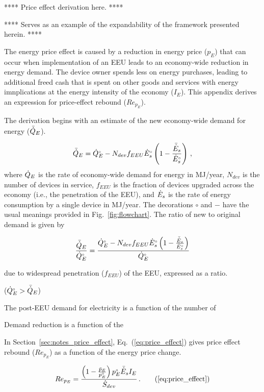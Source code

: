 

**** Price effect derivation here. ****

**** Serves as an example of the expandability 
of the framework presented herein. ****


The energy price effect is caused by a reduction 
in energy price ($p_E$)
that can occur when implementation of an EEU
leads to an economy-wide reduction in energy demand.
The device owner spends less on energy purchases, 
leading to additional freed cash
that is spent on other goods and services
with energy imnplications 
at the energy intensity of the economy ($I_E$).
This appendix derives an expression for 
price-effect rebound ($Re_{p_E}$).

The derivation begins with an estimate of the new economy-wide 
demand for energy ($\bar{\dot{Q}}_E$).

\begin{equation}
  \bar{\dot{Q}}_E = {}{\dot{Q}}^{\scriptscriptstyle \circ}_E - N_{dev} f_{EEU} {}{\dot{E}}^{\scriptscriptstyle \circ}_s \left( 1 - \frac{\bar{\dot{E}}_s}{{}{\dot{E}}^{\scriptscriptstyle \circ}_s} \right) \, ,
\end{equation}
%
where
$\dot{Q}_E$ is the rate of economy-wide demand for energy in MJ/year,
$N_{dev}$ is the number of devices in service, 
$f_{EEU}$ is the fraction of devices upgraded across the economy
(i.e., the penetration of the EEU), and
$\dot{E}_s$ is the rate of energy consumption by a single device in MJ/year.
The decorations $\circ$ and $-$ have the usual meanings
provided in Fig.~\ref{fig:flowchart}.
The ratio of new to original demand is given by

\begin{equation}
  \frac{\bar{\dot{Q}}_E}{{}{\dot{Q}}^{\scriptscriptstyle \circ}_E} =
        \frac{{}{\dot{Q}}^{\scriptscriptstyle \circ}_E - N_{dev} f_{EEU} {}{\dot{E}}^{\scriptscriptstyle \circ}_s \left( 1 - \frac{\bar{\dot{E}}_s}{{}{\dot{E}}^{\scriptscriptstyle \circ}_s}  \right)}
        {{}{\dot{Q}}^{\scriptscriptstyle \circ}_E}
\end{equation}
%



due to widespread penetration ($f_{EEU}$) of the EEU,
expressed as a ratio.


 (${}{\dot{Q}}^{\scriptscriptstyle \circ}_E > \bar{\dot{Q}}_E$)



The post-EEU demand for electricity is a function of the number of 

Demand reduction is a function of the 

In Section~\ref{sec:notes_price_effect}, 
Eq.~(\ref{eq:price_effect}) gives
price effect rebound ($Re_{p_E}$)
as a function of the energy price change.

\begin{equation}
  Re_{p_E} = \frac{\left(1 - \frac{\ainc{p}_E}{\bempl{p}_E}\right) \orig{p}_E \rainc{E}_s I_E}{\Sdot} \, .  \tag{\ref{eq:price_effect}}
\end{equation}
%
